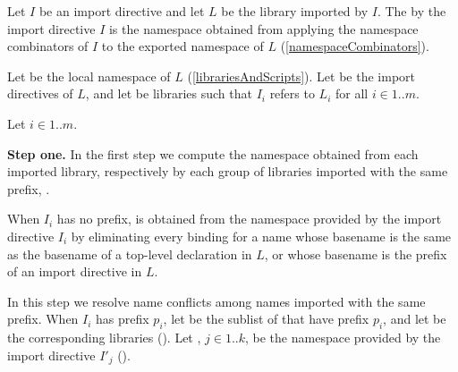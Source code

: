 \documentclass[makeidx]{article}
\begin{document}
{

\LMHash{}%
Let $I$ be an import directive and let $L$ be the library imported by $I$.
The
by the import directive $I$ is the namespace obtained from applying
the namespace combinators of $I$
to the exported namespace of $L$
(\ref{namespaceCombinators}).


\LMHash{}%
Let  be the local namespace of $L$
(\ref{librariesAndScripts}).
Let  be the import directives of $L$,
and let  be libraries
such that $I_i$ refers to $L_i$ for all $i \in 1 .. m$.

\LMHash{}%
Let $i \in 1 .. m$.

\LMHash{}%
{\bf Step one.}
In the first step we compute the namespace obtained from each imported library,
respectively by each group of libraries imported with the same prefix,
.

\LMHash{}%
When $I_i$ has no prefix,  is obtained
from the namespace provided by the import directive $I_i$
by eliminating every binding for a name whose basename is
the same as the basename of a top-level declaration in $L$,
or whose basename is the prefix of an import directive in $L$.

\EndCase

\LMHash{}%
In this step we resolve name conflicts
among names imported with the same prefix.
When $I_i$ has prefix $p_i$,
let  be the sublist of  that have prefix $p_i$,
and let  be the corresponding libraries
().
Let , $j \in 1 .. k$,
be the namespace provided by the import directive $I'_j$
().

}
\end{document}
